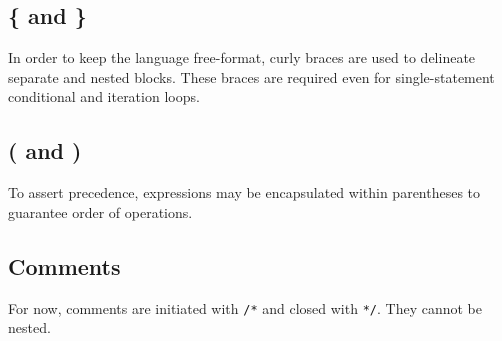 		\subsection{\{ and \}}
			In order to keep the language free-format, curly braces are used to delineate separate and nested blocks. These braces are required even for single-statement conditional and iteration loops.
		\subsection{( and )}
			To assert precedence, expressions may be encapsulated within parentheses to guarantee order of operations. 
		\subsection{Comments}
			For now, comments are initiated with \texttt{/*} and closed with \texttt{*/}. They cannot be nested.